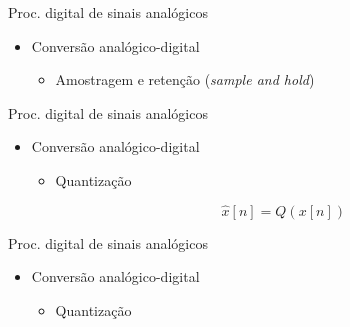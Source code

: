 \begin{slide}{Proc. digital de sinais anal\'ogicos}
\begin{itemize}
   \item Conversão analógico-digital
   \begin{itemize}
      \item Amostragem e retenção (\emph{sample and hold})
      \begin{figure}
        \centering
      \end{figure}

   \end{itemize}
\end{itemize}
\end{slide}

\begin{slide}{Proc. digital de sinais anal\'ogicos}
\begin{itemize}
   \item Conversão analógico-digital
   \begin{itemize}
      \item Quantização 
      \begin{figure}
        \centering
      \end{figure}
\begin{equation}
          \hat x[n] = Q(x[n])
      \end{equation}
   \end{itemize}
\end{itemize}
\end{slide}

\begin{slide}{Proc. digital de sinais anal\'ogicos}
\begin{itemize}
   \item Conversão analógico-digital
   \begin{itemize}
      \item Quantização 
      \begin{figure}
        \centering
      \end{figure}

   \end{itemize}
\end{itemize}
\end{slide}


